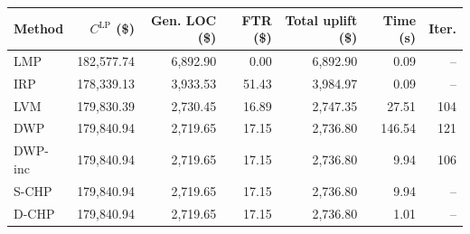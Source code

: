\begin{tabular}{lrrrrrr}
\toprule
Method & $C^{\mathrm{LP}}$ (\$) & Gen. LOC (\$) & FTR (\$) & Total uplift (\$) & Time (s) & Iter. \\
\midrule
LMP & 182,577.74 & 6,892.90 & 0.00 & 6,892.90 & 0.09 & -- \\
IRP & 178,339.13 & 3,933.53 & 51.43 & 3,984.97 & 0.09 & -- \\
LVM & 179,830.39 & 2,730.45 & 16.89 & 2,747.35 & 27.51 & 104 \\
DWP & 179,840.94 & 2,719.65 & 17.15 & 2,736.80 & 146.54 & 121 \\
DWP-inc & 179,840.94 & 2,719.65 & 17.15 & 2,736.80 & 9.94 & 106 \\
S-CHP & 179,840.94 & 2,719.65 & 17.15 & 2,736.80 & 9.94 & -- \\
D-CHP & 179,840.94 & 2,719.65 & 17.15 & 2,736.80 & 1.01 & -- \\
\bottomrule
\end{tabular}
